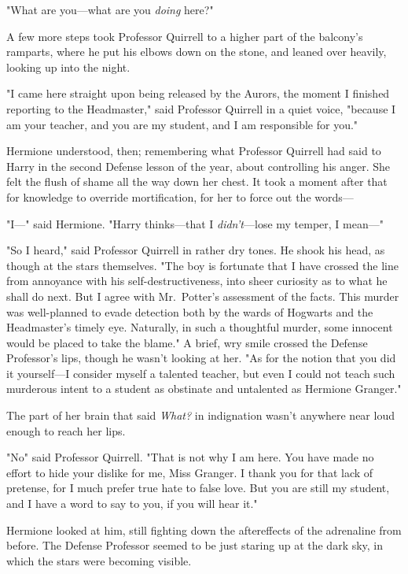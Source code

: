 "What are you---what are you \emph{doing} here?"

A few more steps took Professor Quirrell to a higher part of the balcony's
ramparts, where he put his elbows down on the stone, and leaned over heavily,
looking up into the night.

"I came here straight upon being released by the Aurors, the moment I finished
reporting to the Headmaster," said Professor Quirrell in a quiet voice,
"because I am your teacher, and you are my student, and I am responsible for
you."

Hermione understood, then; remembering what Professor Quirrell had said to
Harry in the second Defense lesson of the year, about controlling his anger.
She felt the flush of shame all the way down her chest. It took a moment after
that for knowledge to override mortification, for her to force out the words---

"I\mbox{---}" said Hermione. "Harry thinks---that I \emph{didn't}---lose my temper, I
mean\mbox{---}"

"So I heard," said Professor Quirrell in rather dry tones. He shook his head,
as though at the stars themselves. "The boy is fortunate that I have crossed
the line from annoyance with his self-destructiveness, into sheer curiosity as
to what he shall do next. But I agree with Mr.~Potter's assessment of the
facts. This murder was well-planned to evade detection both by the wards of
Hogwarts and the Headmaster's timely eye. Naturally, in such a thoughtful
murder, some innocent would be placed to take the blame." A brief, wry smile
crossed the Defense Professor's lips, though he wasn't looking at her. "As for
the notion that you did it yourself---I consider myself a talented teacher, but
even I could not teach such murderous intent to a student as obstinate and
untalented as Hermione Granger."

The part of her brain that said \emph{What?} in indignation wasn't anywhere
near loud enough to reach her lips.

"No{\el}" said Professor Quirrell. "That is not why I am here. You have made
no effort to hide your dislike for me, Miss Granger. I thank you for that lack
of pretense, for I much prefer true hate to false love. But you are still my
student, and I have a word to say to you, if you will hear it."

Hermione looked at him, still fighting down the aftereffects of the adrenaline
from before. The Defense Professor seemed to be just staring up at the dark
sky, in which the stars were becoming visible.

